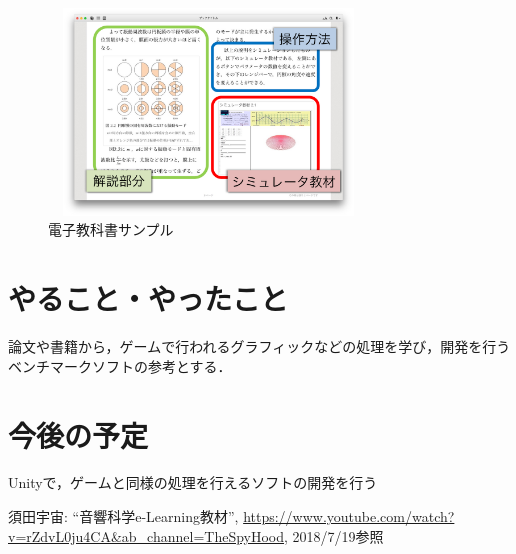 \documentclass[twocolumn,10pt,a4j]{ltjsarticle}
\begin{document}
\begin{figure}[h]
\begin{center}
 \includegraphics[clip,width=85mm,height=55mm]{textbook.pdf}
\end{center}
 \caption{電子教科書サンプル}
 \label{fig:教科書}
\end{figure}

\section{やること・やったこと}

論文や書籍から，ゲームで行われるグラフィックなどの処理を学び，開発を行うベンチマークソフトの参考とする．


\section{今後の予定}
Unityで，ゲームと同様の処理を行えるソフトの開発を行う

\begin{thebibliography}{99}
 須田宇宙: ``音響科学e-Learning教材'', \url{https://www.youtube.com/watch?v=rZdvL0ju4CA&ab_channel=TheSpyHood}, 2018/7/19参照
\end{thebibliography}
\end{document}
